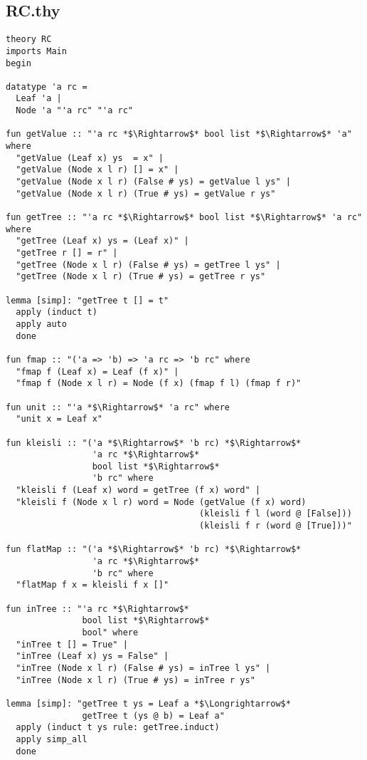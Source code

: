 \subsection{RC.thy}
%
\begin{lstlisting}[language=Isabelle]
theory RC
imports Main
begin

datatype 'a rc = 
  Leaf 'a |
  Node 'a "'a rc" "'a rc"

fun getValue :: "'a rc *$\Rightarrow$* bool list *$\Rightarrow$* 'a" where
  "getValue (Leaf x) ys  = x" |
  "getValue (Node x l r) [] = x" |
  "getValue (Node x l r) (False # ys) = getValue l ys" |
  "getValue (Node x l r) (True # ys) = getValue r ys"

fun getTree :: "'a rc *$\Rightarrow$* bool list *$\Rightarrow$* 'a rc" where
  "getTree (Leaf x) ys = (Leaf x)" |
  "getTree r [] = r" |
  "getTree (Node x l r) (False # ys) = getTree l ys" |
  "getTree (Node x l r) (True # ys) = getTree r ys"

lemma [simp]: "getTree t [] = t"
  apply (induct t)
  apply auto
  done

fun fmap :: "('a => 'b) => 'a rc => 'b rc" where
  "fmap f (Leaf x) = Leaf (f x)" |
  "fmap f (Node x l r) = Node (f x) (fmap f l) (fmap f r)"

fun unit :: "'a *$\Rightarrow$* 'a rc" where
  "unit x = Leaf x"

fun kleisli :: "('a *$\Rightarrow$* 'b rc) *$\Rightarrow$* 
                 'a rc *$\Rightarrow$* 
                 bool list *$\Rightarrow$* 
                 'b rc" where
  "kleisli f (Leaf x) word = getTree (f x) word" |
  "kleisli f (Node x l r) word = Node (getValue (f x) word) 
                                      (kleisli f l (word @ [False])) 
                                      (kleisli f r (word @ [True]))" 

fun flatMap :: "('a *$\Rightarrow$* 'b rc) *$\Rightarrow$* 
                 'a rc *$\Rightarrow$* 
                 'b rc" where
  "flatMap f x = kleisli f x []"   

fun inTree :: "'a rc *$\Rightarrow$* 
               bool list *$\Rightarrow$* 
               bool" where
  "inTree t [] = True" |
  "inTree (Leaf x) ys = False" |
  "inTree (Node x l r) (False # ys) = inTree l ys" |
  "inTree (Node x l r) (True # ys) = inTree r ys"

lemma [simp]: "getTree t ys = Leaf a *$\Longrightarrow$* 
               getTree t (ys @ b) = Leaf a"
  apply (induct t ys rule: getTree.induct)
  apply simp_all
  done


\end{lstlisting}
